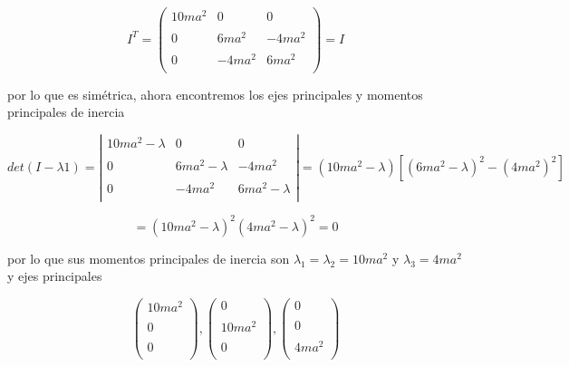 \documentclass[12pt,a4paper]{article}
\begin{document}
\begin{enumerate}
\begin{equation*}
    I^T = \left( \begin{array}{lcc}
            10m a^2 & 0 & 0 \\
            \\ 0 & 6ma^2 & -4ma^2 \\
            \\ 0 & -4ma^2 & 6 ma^2 \\
        \end{array}
        \right) = I
\end{equation*}

por lo que es simétrica, ahora encontremos los ejes principales y momentos principales de inercia

\begin{equation*}
    det(I - \lambda 1) = \left| \begin{array}{lcc}
            10m a^2 - \lambda & 0 & 0 \\
            \\ 0 & 6ma^2 - \lambda & -4ma^2 \\
            \\ 0 & -4ma^2 & 6 ma^2 - \lambda \\
        \end{array}
        \right| = (10ma^2 - \lambda) [(6ma^2 - \lambda)^2 - (4ma^2)^2]
\end{equation*}

\begin{equation*}
    = (10ma^2 - \lambda)^2 (4ma^2 - \lambda)^2 = 0
\end{equation*}

por lo que sus momentos principales de inercia son $\lambda_1 = \lambda_2 =10ma^2$ y $\lambda_3 = 4ma^2$ y ejes principales

\begin{equation*}
    \left( \begin{array}{lcc}
            10m a^2 \\
            \\ 0 \\
            \\ 0\\
        \end{array}
        \right)  , \left( \begin{array}{lcc}
            0 \\
            \\ 10 m a^2 \\
            \\ 0\\
        \end{array}
        \right),
        \left( \begin{array}{lcc}
            0\\
            \\ 0 \\
            \\ 4ma^2\\
        \end{array}
        \right) 
\end{equation*}








\end{enumerate}
\end{document}
